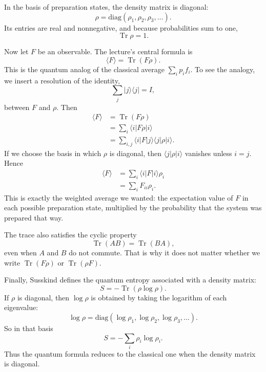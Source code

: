 In the basis of preparation states, the density matrix is diagonal:
\begin{equation}
\rho=\mathrm{diag}(\rho_1,\rho_2,\rho_3,\ldots) .
\end{equation}
Its entries are real and nonnegative, and because probabilities sum to one,
\begin{equation}
\operatorname{Tr}\rho=1 .
\end{equation}

Now let \(F\) be an observable. The lecture's central formula is
\begin{equation}
\langle F\rangle=\operatorname{Tr}(F\rho) .
\end{equation}
This is the quantum analog of the classical average \(\sum_i p_i f_i\). To see the analogy, we insert a resolution of the identity,
\begin{equation}
\sum_j |j\rangle\langle j| = I ,
\end{equation}
between \(F\) and \(\rho\). Then
\begin{align}
\langle F\rangle
&=
\operatorname{Tr}(F\rho) \\
&=
\sum_i \langle i|F\rho|i\rangle \\
&=
\sum_{i,j}\langle i|F|j\rangle\langle j|\rho|i\rangle .
\end{align}
If we choose the basis in which \(\rho\) is diagonal, then \(\langle j|\rho|i\rangle\) vanishes unless \(i=j\). Hence
\begin{align}
\langle F\rangle
&=
\sum_i \langle i|F|i\rangle \rho_i \\
&=
\sum_i F_{ii}\rho_i .
\end{align}
This is exactly the weighted average we wanted: the expectation value of \(F\) in each possible preparation state, multiplied by the probability that the system was prepared that way.

The trace also satisfies the cyclic property
\begin{equation}
\operatorname{Tr}(AB)=\operatorname{Tr}(BA) ,
\end{equation}
even when \(A\) and \(B\) do not commute. That is why it does not matter whether we write \(\operatorname{Tr}(F\rho)\) or \(\operatorname{Tr}(\rho F)\).

Finally, Susskind defines the quantum entropy associated with a density matrix:
\begin{equation}
S=-\operatorname{Tr}(\rho\log\rho) .
\end{equation}
If \(\rho\) is diagonal, then \(\log\rho\) is obtained by taking the logarithm of each eigenvalue:
\begin{equation}
\log\rho=\mathrm{diag}(\log\rho_1,\log\rho_2,\log\rho_3,\ldots) .
\end{equation}
So in that basis
\begin{equation}
S=-\sum_i \rho_i\log\rho_i .
\end{equation}
Thus the quantum formula reduces to the classical one when the density matrix is diagonal.

